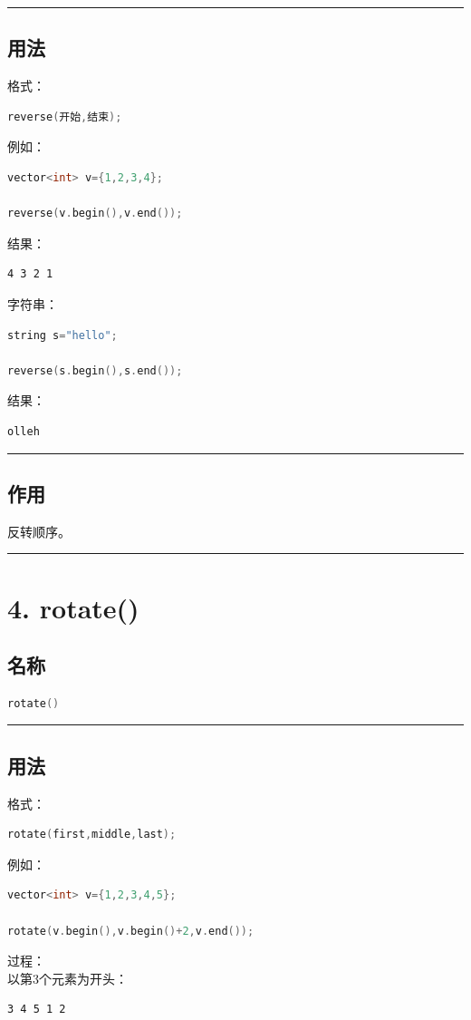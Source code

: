 \documentclass[10pt,twocolumn]{extarticle}
\begin{document}
\noindent\rule{\linewidth}{0.4pt}

\subsection{用法}
格式：
\begin{lstlisting}[language=C++]
reverse(开始,结束);
\end{lstlisting}
例如：
\begin{lstlisting}[language=C++]
vector<int> v={1,2,3,4};

reverse(v.begin(),v.end());
\end{lstlisting}
结果：
\begin{lstlisting}
4 3 2 1
\end{lstlisting}

字符串：
\begin{lstlisting}[language=C++]
string s="hello";

reverse(s.begin(),s.end());
\end{lstlisting}
结果：
\begin{lstlisting}
olleh
\end{lstlisting}

\noindent\rule{\linewidth}{0.4pt}

\subsection{作用}
反转顺序。

\noindent\rule{\linewidth}{0.4pt}

\section{4. rotate()}

\subsection{名称}
\begin{lstlisting}[language=C++]
rotate()
\end{lstlisting}

\noindent\rule{\linewidth}{0.4pt}

\subsection{用法}
格式：
\begin{lstlisting}[language=C++]
rotate(first,middle,last);
\end{lstlisting}
例如：
\begin{lstlisting}[language=C++]
vector<int> v={1,2,3,4,5};

rotate(v.begin(),v.begin()+2,v.end());
\end{lstlisting}
过程：\\
以第3个元素为开头：
\begin{lstlisting}
3 4 5 1 2
\end{lstlisting}
\end{document}

